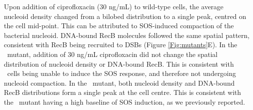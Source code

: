 Upon addition of ciprofloxacin (30 ng/mL) to wild-type cells, the average nucleoid density changed from a bilobed distribution to a single peak, centred on the cell mid-point. This can be attributed to SOS-induced compaction of the bacterial nucleoid. DNA-bound RecB molecules followed the same spatial pattern, consistent with RecB being recruited to DSBs (Figure \ref{Fig:mutants}E). In the \dreca\ mutant, addition of 30 ng/mL ciprofloxacin did not change the spatial distribution of nucleoid density or DNA-bound RecB. This is consistent with \dreca\ cells being unable to induce the SOS response, and therefore not undergoing nucleoid compaction. In the \teneighty\ mutant, both nucleoid density and DNA-bound RecB distributions form a single peak at the cell centre. This is consistent with the \teneighty\ mutant having a high baseline of SOS induction, as we previously reported.\cite{Lepore2023}

